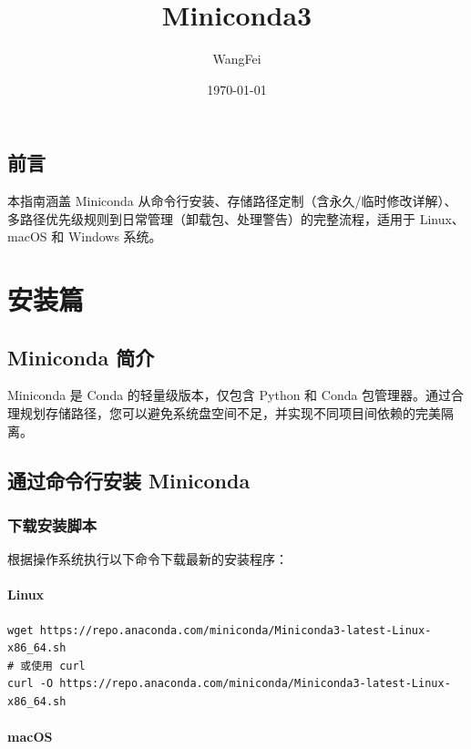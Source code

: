 \documentclass[12pt,UTF8]{ctexbook}
\title{\heiti\zihao{0} Miniconda3}
\author{WangFei}
\date{\today}
\begin{document}
\maketitle
\tableofcontents

\frontmatter
\chapter{前言}

本指南涵盖 Miniconda 从命令行安装、存储路径定制（含永久/临时修改详解）、多路径优先级规则到日常管理（卸载包、处理警告）的完整流程，适用于 Linux、macOS 和 Windows 系统。

\mainmatter

\part{安装篇}

\chapter{Miniconda 简介}
\label{chap:introduction}

Miniconda 是 Conda 的轻量级版本，仅包含 Python 和 Conda 包管理器。通过合理规划存储路径，您可以避免系统盘空间不足，并实现不同项目间依赖的完美隔离。

\chapter{通过命令行安装 Miniconda}
\label{chap:installation}

\section{下载安装脚本}
\label{sec:download_script}

根据操作系统执行以下命令下载最新的安装程序：

\subsection{Linux}

\begin{lstlisting}
wget https://repo.anaconda.com/miniconda/Miniconda3-latest-Linux-x86_64.sh
# 或使用 curl
curl -O https://repo.anaconda.com/miniconda/Miniconda3-latest-Linux-x86_64.sh
\end{lstlisting}

\subsection{macOS}
\end{document}
